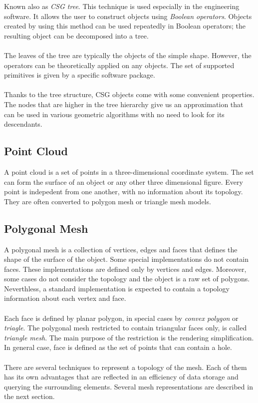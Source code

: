 Known also as \emph{CSG tree}\cite{Zara2004}. This technique is used especially
in the engineering software. It allows
the user to construct objects using \emph{Boolean operators}. Objects created by using this
method can be used repeatedly in Boolean operators; the resulting object can be decomposed into a tree.
\\
\\
The leaves of the tree are typically the objects of the simple shape. However, the operators can be
theoretically applied on any objects. The set of supported primitives is given by a specific
software package.
\\
\\
Thanks to the tree structure, CSG objects come with some convenient properties. The nodes that
are higher in the tree hierarchy give us an approximation that can be used in various geometric
algorithms with no need to look for its descendants.

\subsection{Point Cloud}

A point cloud is a set of points in a three-dimensional coordinate system\cite{Zara2004}\cite{Agarwal2006}.
The set can form the surface
of an object or any other three dimensional figure. Every point is indepedent
from one another, with no information about its topology. They are often converted to polygon mesh
or triangle mesh models.

\subsection{Polygonal Mesh}

A polygonal mesh is a collection of vertices, edges and faces that defines the shape of the surface of
the object\cite{Zara2004}. Some special implementations do not contain faces. These implementations are
defined only by vertices and
edges. Moreover, some cases do not consider the topology and the object is a raw set of polygons.
Neverthless, a standard implementation is expected to contain a topology information about each vertex
and face.
\\
\\
Each face is defined by planar polygon, in special cases by \emph{convex polygon} or \emph{triagle}.
The polygonal mesh restricted to contain triangular faces only, is called \emph{triangle mesh}.
The main purpose of the restriction is the rendering simplification. In general case, face is defined
as the set of points that can contain a hole.
\\
\\
There are several techniques to represent a topology of the mesh. Each of them has its own advantages
that are reflected in an efficiency of data storage and querying the surrounding elements. Several
mesh representations are described in the next section.

